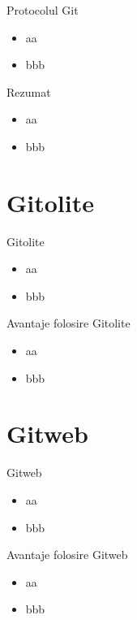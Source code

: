 \documentclass{beamer}
\begin{document}
\begin{frame}{Protocolul Git}
	\begin{itemize}
		\item aa
		\item bbb
	\end{itemize}
\end{frame}

\begin{frame}{Rezumat}
	\begin{itemize}
		\item aa
		\item bbb
	\end{itemize}
\end{frame}

\section{Gitolite}

\frame{\tableofcontents[currentsection]}

\begin{frame}{Gitolite}
	\begin{itemize}
		\item aa
		\item bbb
	\end{itemize}
\end{frame}

\begin{frame}{Avantaje folosire Gitolite}
	\begin{itemize}
		\item aa
		\item bbb
	\end{itemize}
\end{frame}

\section{Gitweb}

\frame{\tableofcontents[currentsection]}

\begin{frame}{Gitweb}
	\begin{itemize}
		\item aa
		\item bbb
	\end{itemize}
\end{frame}

\begin{frame}{Avantaje folosire Gitweb}
	\begin{itemize}
		\item aa
		\item bbb
	\end{itemize}
\end{frame}
\end{document}
